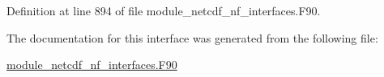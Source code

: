 Definition at line 894 of file module\+\_\+netcdf\+\_\+nf\+\_\+interfaces.\+F90.



The documentation for this interface was generated from the following file\+:\begin{DoxyCompactItemize}
\item 
\hyperlink{module__netcdf__nf__interfaces_8F90}{module\+\_\+netcdf\+\_\+nf\+\_\+interfaces.\+F90}\end{DoxyCompactItemize}
